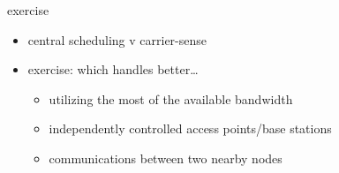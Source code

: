 \begin{frame}{exercise}
    \begin{itemize}
    \item central scheduling v carrier-sense
    \vspace{.5cm}
    \item exercise: which handles better\ldots
        \begin{itemize}
        \item utilizing the most of the available bandwidth
        \item independently controlled access points/base stations
        \item communications between two nearby nodes
        \end{itemize}
    \end{itemize}
\end{frame}

